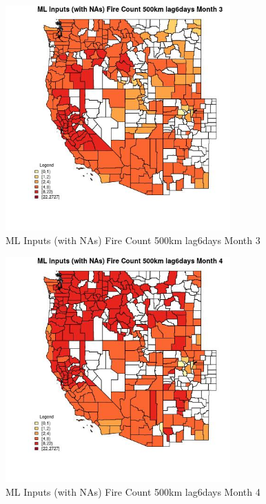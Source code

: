 \begin{figure} 
\centering  
\includegraphics[width=0.77\textwidth]{Code_Outputs/Report_ML_input_PM25_Step4_part_f_de_duplicated_aves_prioritize_24hr_obswNAs_CountyFire_Count_500km_lag6daysmedianMonth3.jpg} 
\caption{\label{fig:Report_ML_input_PM25_Step4_part_f_de_duplicated_aves_prioritize_24hr_obswNAsCountyFire_Count_500km_lag6daysmedianMonth3}ML Inputs (with NAs) Fire Count 500km lag6days Month 3} 
\end{figure} 
 

\begin{figure} 
\centering  
\includegraphics[width=0.77\textwidth]{Code_Outputs/Report_ML_input_PM25_Step4_part_f_de_duplicated_aves_prioritize_24hr_obswNAs_CountyFire_Count_500km_lag6daysmedianMonth4.jpg} 
\caption{\label{fig:Report_ML_input_PM25_Step4_part_f_de_duplicated_aves_prioritize_24hr_obswNAsCountyFire_Count_500km_lag6daysmedianMonth4}ML Inputs (with NAs) Fire Count 500km lag6days Month 4} 
\end{figure} 
 

